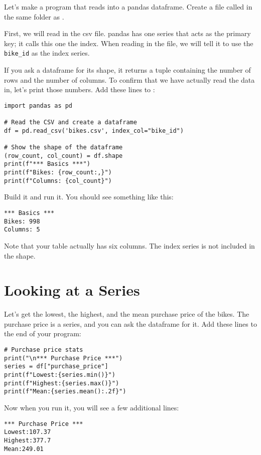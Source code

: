 Let's make a program that reads  into a pandas
dataframe.  Create a file called  in the same
folder as .

First, we will read in the csv file. pandas has one series that acts
as the primary key; it calls this one the index. When reading in the
file, we will tell it to use the \texttt{bike\_id} as the index
series.

If you ask a dataframe for its shape, it returns a tuple containing
the number of rows and the number of columns. To confirm that we have
actually read the data in, let's print those numbers.  Add these lines
to :

\begin{Verbatim}
import pandas as pd

# Read the CSV and create a dataframe
df = pd.read_csv('bikes.csv', index_col="bike_id")

# Show the shape of the dataframe
(row_count, col_count) = df.shape
print(f"*** Basics ***")
print(f"Bikes: {row_count:,}")
print(f"Columns: {col_count}")
\end{Verbatim}

Build it and run it. You should see something like this:
\begin{Verbatim}
*** Basics ***
Bikes: 998
Columns: 5
\end{Verbatim}

Note that your table actually has six columns. The index series is
not included in the shape.

\section{Looking at a Series}

Let's get the lowest, the highest, and the mean purchase price of the
bikes.  The purchase price is a series, and you can ask the dataframe
for it. Add these lines to the end of your program:

\begin{Verbatim}
# Purchase price stats
print("\n*** Purchase Price ***")
series = df["purchase_price"]
print(f"Lowest:{series.min()}")
print(f"Highest:{series.max()}")
print(f"Mean:{series.mean():.2f}")
\end{Verbatim}

Now when you run it, you will see a few additional lines:
\begin{Verbatim}
*** Purchase Price ***
Lowest:107.37
Highest:377.7
Mean:249.01
\end{Verbatim}

